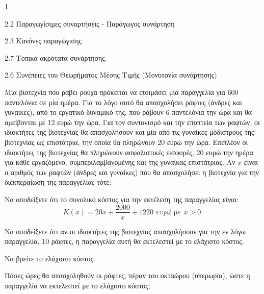 \begin{ylh}{1}
    \item 2.2 Παραγωγίσιμες συναρτήσεις - Παράγωγος συνάρτηση
    \item 2.3 Κανόνες παραγώγισης
    \item 2.7 Τοπικά ακρότατα συνάρτησης.
    \item 2.6 Συνέπειες του Θεωρήματος Μέσης Τιμής (Μονοτονία συνάρτησης)
\end{ylh}
Μία βιοτεχνία που ράβει ρούχα πρόκειται να ετοιμάσει μία παραγγελία για 600 παντελόνια σε μία ημέρα. Για το λόγο αυτό θα απασχολήσει ράφτες (άνδρες και γυναίκες), από το εργατικό δυναμικό της, που ράβουν 6 παντελόνια την ώρα και θα αμείβονται με 12 ευρώ την ώρα. Για τον συντονισμό και την εποπτεία των ραφτών, οι ιδιοκτήτες της βιοτεχνίας θα απασχολήσουν και μία από τις γυναίκες μόδιστρους της βιοτεχνίας ως επιστάτρια, την οποία θα πληρώνουν 20 ευρώ την ώρα. Επιπλέον οι ιδιοκτήτες της βιοτεχνίας θα πληρώνουν ασφαλιστικές εισφορές, 20 ευρώ την ημέρα για κάθε εργαζόμενο, συμπεριλαμβανομένης και της γυναίκας επιστάτριας.
Αν $x$ είναι ο αριθμός των ραφτών (άνδρες και γυναίκες) που θα απασχολήσει η βιοτεχνία για την διεκπεραίωση της παραγγελίας τότε:
\begin{alist}
\item Να αποδείξετε ότι το συνολικό κόστος για την εκτέλεση της παραγγελίας είναι:
\[ K(x) = 20x + \frac{2000}{x} + 1220 \text{ ευρώ με } x > 0. \] 
\item Να αποδείξετε ότι αν οι ιδιοκτήτες της βιοτεχνίας απασχολήσουν για την εν λόγω παραγγελία, 10 ράφτες, η παραγγελία αυτή θα εκτελεστεί με το ελάχιστο κόστος. 
\item Να βρείτε το ελάχιστο κόστος. 
\item Πόσες ώρες θα απασχοληθούν οι ράφτες, πέραν του οκταώρου (υπερωρία), ώστε η παραγγελία να εκτελεστεί με το ελάχιστο κόστος; 
\end{alist}